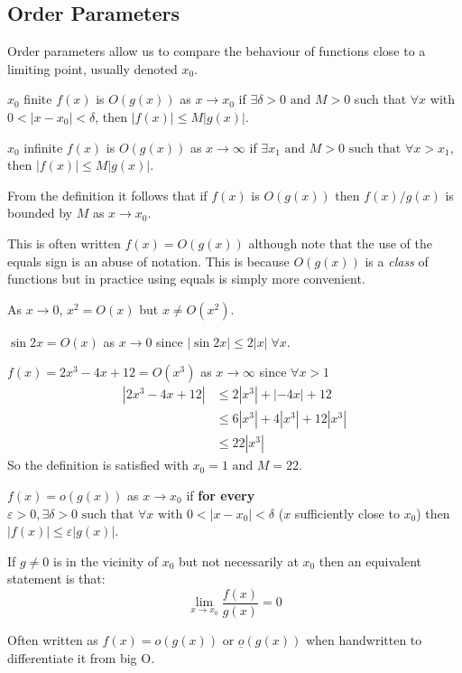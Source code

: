 \documentclass[../main.tex]{subfiles}
\begin{document}
\subsection{Order Parameters}
Order parameters allow us to compare the behaviour of functions close to a limiting point, usually denoted $x_0$.
\begin{definition}
  \begin{proofcases}
    \begin{case}{$x_0$ finite}
      $f(x)$ is $O(g(x))$ as $x \to x_0$ if $\exists \delta > 0 \text{ and } M > 0$ such that $\forall x$ with $0 < |x - x_0| < \delta$, then $|f(x)| \leq M |g(x)|$.
    \end{case}
    \begin{case}{$x_0$ infinite}
      $f(x)$ is $O(g(x))$ as $x \to \infty$ if $\exists x_1 \text{ and } M > 0 \text{ such that } \forall x > x_1$, then $|f(x)| \leq M|g(x)|$.
    \end{case}
  \end{proofcases}
\end{definition}
From the definition it follows that if $f(x)$ is $O(g(x))$ then $f(x)/g(x)$ is bounded by $M$ as $x \to x_0$.
\begin{remark}[Notation]
This is often written $f(x) = O(g(x))$ although note that the use of the equals sign is an abuse of notation.
This is because $O(g(x))$ is a \textit{class} of functions but in practice using equals is simply more convenient.
\end{remark}
\begin{example}
  As $x \to 0$, $x^2 = O(x)$ but $x \neq O(x^2)$.
\end{example}
\begin{example}
  $\sin 2x = O(x)$ as $x \to 0$ since $|\sin 2x| \leq 2|x|\;\forall x$.
\end{example}
\begin{example}
  $f(x) = 2x^3 - 4x + 12 = O(x^3)$ as $x \to \infty$ since $\forall x > 1$
  \begin{align*}
    |2x^3 - 4x + 12| &\leq 2|x^3| + |-4x| + 12 \\
                     &\leq 6|x^3| + 4|x^3| + 12|x^3| \\
                     &\leq 22|x^3|
  \end{align*}
  So the definition is satisfied with $x_0 = 1 \text{ and } M = 22$.
\end{example}
\begin{definition}
  $f(x) = o(g(x))$ as $x \to x_0$ if \textbf{for every} $\varepsilon > 0, \exists \delta > 0 \text{ such that } \forall x \text{ with } 0 < |x - x_0| < \delta$ ($x$ sufficiently close to $x_0$) then $|f(x)| \leq \varepsilon |g(x)|$.

  If $g \neq 0$ is in the vicinity of $x_0$ but not necessarily at $x_0$ then an equivalent statement is that:
  \[
    \lim_{x \to x_0} \frac{f(x)}{g(x)} = 0
  \]
\end{definition}
\begin{remark}[Notation]
  Often written as $f(x) = o(g(x))$ or $\underline{o}(g(x))$ when handwritten to differentiate it from big O.
\end{remark}
\end{document}
